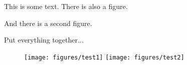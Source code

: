 \documentclass{article}
\begin{document}
This is some text. There is also a figure.


And there is a second figure.


Put everything together...

\begin{figure}
\texttt{[image: figures/test1]}
\endpgfgraphicnamed%
\texttt{[image: figures/test2]}
\endpgfgraphicnamed
\end{figure}
\end{document}
